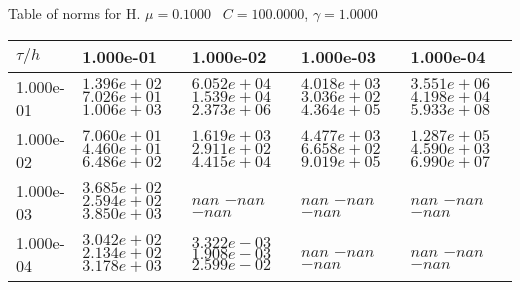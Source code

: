 \begin{center}
Table of norms for H. $\mu = 0.1000$ \, $C = 100.0000$, $\gamma = 1.0000$
  
\begin{tabular}{|p{1in}|p{1in}|p{1in}|p{1in}|p{1in}|} \hline
$\tau / h$ &1.000e-01 &1.000e-02 &1.000e-03 &1.000e-04 \\ \hline 
1.000e-01 & $1.396e+02$  $7.026e+01$  $1.006e+03$  & $6.052e+04$  $1.539e+04$  $2.373e+06$  & $4.018e+03$  $3.036e+02$  $4.364e+05$  & $3.551e+06$  $4.198e+04$  $5.933e+08$  \\ \hline 
1.000e-02 & $7.060e+01$  $4.460e+01$  $6.486e+02$  & $1.619e+03$  $2.911e+02$  $4.415e+04$  & $4.477e+03$  $6.658e+02$  $9.019e+05$  & $1.287e+05$  $4.590e+03$  $6.990e+07$  \\ \hline 
1.000e-03 & $3.685e+02$  $2.594e+02$  $3.850e+03$  & $nan$  $-nan$  $-nan$  & $nan$  $-nan$  $-nan$  & $nan$  $-nan$  $-nan$  \\ \hline 
1.000e-04 & $3.042e+02$  $2.134e+02$  $3.178e+03$  & $3.322e-03$  $1.908e-03$  $2.599e-02$  & $nan$  $-nan$  $-nan$  & $nan$  $-nan$  $-nan$  \\ \hline 

\end{tabular}\\[20pt]
\end{center}
